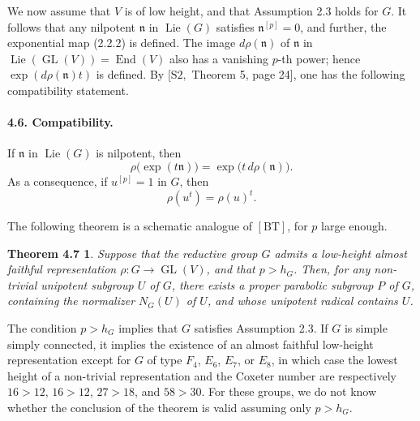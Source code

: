 \documentclass[11pt]{article}
\newcommand{\Lie}{\operatorname{Lie}}
\newcommand{\GL}{\operatorname{GL}}
\newcommand{\End}{\operatorname{End}}
\newtheorem*{theorem47}{Theorem 4.7}
\begin{document}
We now assume that \(V\) is of low height, and that Assumption 2.3 holds for \(G\).
It follows that any nilpotent \(\mathfrak n\) in \(\Lie(G)\) satisfies
\(\mathfrak n^{[p]}=0\), and further, the exponential map (2.2.2) is defined. The image
\(d\rho(\mathfrak n)\) of \(\mathfrak n\) in
\(\Lie(\GL(V))=\End(V)\) also has a vanishing \(p\)-th power; hence
\(\exp(d\rho(\mathfrak n)t)\) is defined. By \([\mathrm{S2},\) Theorem 5, page 24],
one has the following compatibility statement.

\paragraph{4.6. Compatibility.}
If \(\mathfrak n\) in \(\Lie(G)\) is nilpotent, then
\begin{equation}
  \rho\bigl(\exp(t\mathfrak n)\bigr)=\exp\bigl(t\,d\rho(\mathfrak n)\bigr).
  \tag{4.6.1}
\end{equation}
As a consequence, if \(u^{[p]}=1\) in \(G\), then
\begin{equation}
  \rho(u^t)=\rho(u)^t.
  \tag{4.6.2}
\end{equation}

The following theorem is a schematic analogue of \([\mathrm{BT}]\), for \(p\) large enough.

\begin{theorem47}
Suppose that the reductive group \(G\) admits a low-height almost faithful representation
\(\rho:G\to\GL(V)\), and that \(p>h_G\). Then, for any non-trivial unipotent subgroup
\(U\) of \(G\), there exists a proper parabolic subgroup \(P\) of \(G\), containing the
normalizer \(N_G(U)\) of \(U\), and whose unipotent radical contains \(U\).
\end{theorem47}

The condition \(p>h_G\) implies that \(G\) satisfies Assumption 2.3. If \(G\) is simple
simply connected, it implies the existence of an almost faithful low-height representation
except for \(G\) of type \(F_4\), \(E_6\), \(E_7\), or \(E_8\), in which case the lowest
height of a non-trivial representation and the Coxeter number are respectively
\(16>12\), \(16>12\), \(27>18\), and \(58>30\). For these groups, we do not know
whether the conclusion of the theorem is valid assuming only \(p>h_G\).
\end{document}
